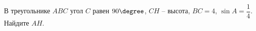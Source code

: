 \begin{ex}
	\begin{condition}
		В треугольнике \( ABC \) угол \( C \) равен \( 90 \degree \), \( CH \) – высота, \( BC=4 \),  \( \sin A = \dfrac{1}{4} \). Найдите \( AH \).
	\end{condition}
\end{ex}
